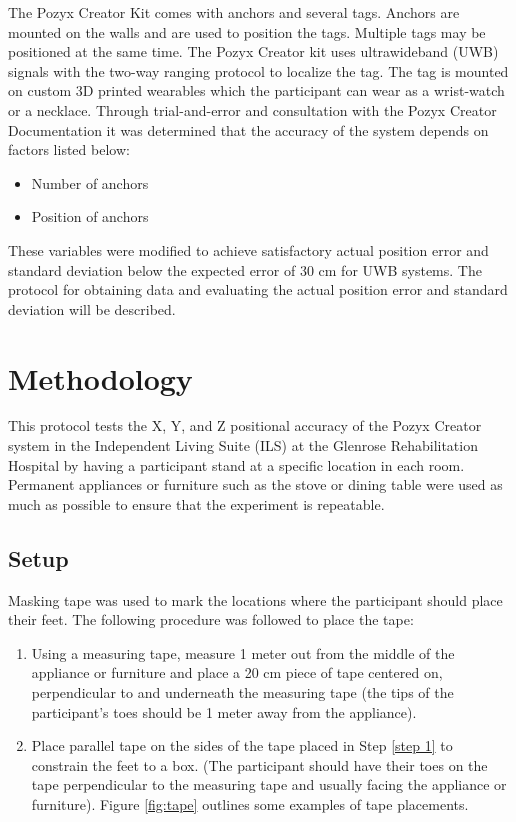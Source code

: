 The Pozyx Creator Kit comes with anchors and several tags. Anchors are mounted 
on the walls and are used to position the tags. Multiple tags may be positioned
at the same time.
The Pozyx Creator kit uses ultrawideband (UWB) signals with the two-way ranging protocol to localize the tag. 
The tag is mounted on custom 3D printed wearables which the participant can wear as 
a wrist-watch or a necklace. Through trial-and-error and consultation with the Pozyx Creator Documentation
\cite{noauthor_hardware_nodate,noauthor_configuration_nodate}
it was determined that the accuracy of the system depends on factors listed below:

\begin{itemize}
    \item Number of anchors
    \item Position of anchors
\end{itemize}

These variables were modified to achieve satisfactory actual position error
and standard deviation below the expected error of 30 cm for UWB systems. The 
protocol for obtaining data and evaluating the actual position error and 
standard deviation will be described.

\section{Methodology}
This protocol tests the X, Y, and Z positional accuracy of the Pozyx Creator system in the Independent
Living Suite (ILS) at the Glenrose Rehabilitation Hospital by having a participant stand at 
a specific location in each room. Permanent appliances or furniture such as the stove
or dining table were used as much as possible to ensure that the experiment is repeatable.

\subsection{Setup}
Masking tape was used to mark the locations where the participant should place their feet.
The following procedure was followed to place the tape:
\begin{enumerate}
    \item Using a measuring tape, measure 1 meter out from the middle of the 
    appliance or furniture and place a 20 cm piece of tape centered on, perpendicular to
    and underneath the measuring tape (the tips of the participant's toes should be 1 meter
    away from the appliance).\label{step 1}
    \item Place parallel tape on the sides of the tape placed in Step \ref{step 1} to constrain
    the feet to a box. (The participant should have their toes on the tape perpendicular to the
    measuring tape and usually facing the appliance or furniture).
    Figure \ref{fig:tape} outlines some examples of tape placements.
\end{enumerate}


